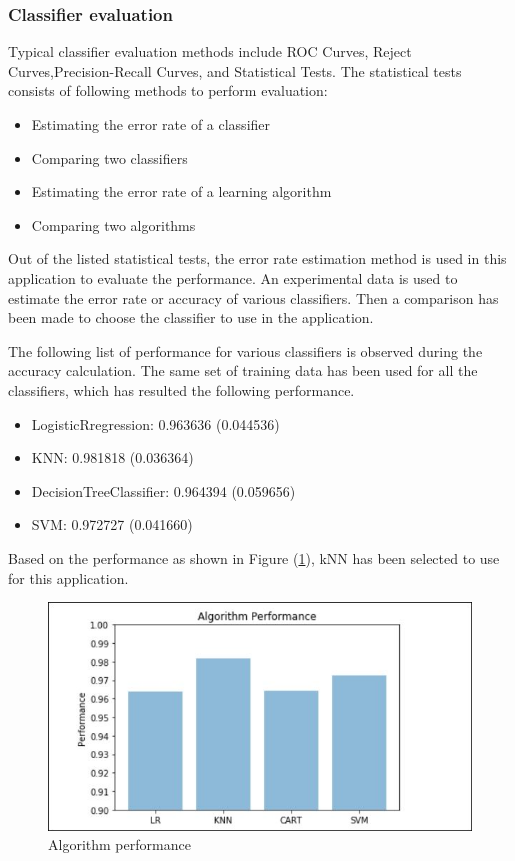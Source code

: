 \documentclass[sigconf]{acmart}
\begin{document}
\subsubsection{Classifier evaluation}
Typical classifier evaluation methods include ROC Curves, Reject Curves,Precision-Recall Curves, and Statistical Tests. The statistical tests consists of following methods to perform evaluation:
\begin{itemize}
    \item Estimating the error rate of a classifier
    \item Comparing two classifiers
    \item Estimating the error rate of a learning algorithm
    \item Comparing two algorithms
\end{itemize}

Out of the listed statistical tests, the error rate estimation method is used in this application to evaluate the performance. An experimental data is used to estimate the error rate or accuracy of various classifiers. Then a comparison has been made to choose the classifier to use in the application.

The following list of performance for various classifiers is observed during the accuracy calculation. The same set of training data has been used for all the classifiers, which has resulted the following performance.
\begin{itemize}
\item LogisticRregression: 0.963636 (0.044536)
\item KNN: 0.981818 (0.036364)
\item DecisionTreeClassifier: 0.964394 (0.059656)
\item SVM: 0.972727 (0.041660)
\end{itemize}

Based on the performance as shown in Figure (\ref{fig:Figure4}), kNN has been selected to use for this application. 

\begin{figure}
\includegraphics[width=0.9\columnwidth]{images/algperformance}
\caption{Algorithm performance} \label{fig:Figure4}
\end{figure}
\end{document}
